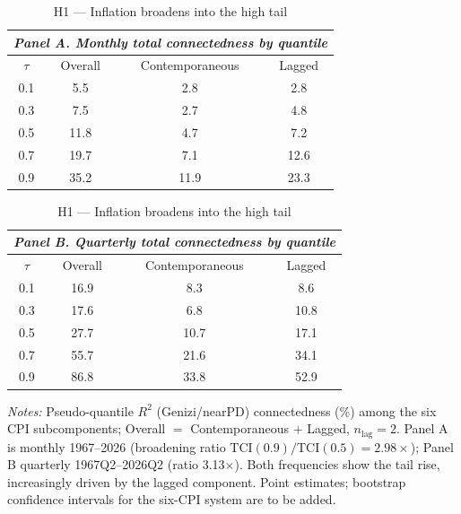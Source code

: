 \begin{table}[!ht]
\centering
\caption{H1 --- Inflation broadens into the high tail}
\label{tab:h1}
\setlength{\tabcolsep}{6pt}\footnotesize
\begin{threeparttable}
\begin{tabular}{c c c c}
\multicolumn{4}{l}{\textit{Panel A. Monthly total connectedness by quantile}}\\
\toprule
$\tau$ & Overall & Contemporaneous & Lagged \\
\midrule
0.1 & 5.5 & 2.8 & 2.8 \\
0.3 & 7.5 & 2.7 & 4.8 \\
0.5 & 11.8 & 4.7 & 7.2 \\
0.7 & 19.7 & 7.1 & 12.6 \\
0.9 & 35.2 & 11.9 & 23.3 \\
\bottomrule
\end{tabular}

\vspace{4pt}
\begin{tabular}{c c c c}
\multicolumn{4}{l}{\textit{Panel B. Quarterly total connectedness by quantile}}\\
\toprule
$\tau$ & Overall & Contemporaneous & Lagged \\
\midrule
0.1 & 16.9 & 8.3 & 8.6 \\
0.3 & 17.6 & 6.8 & 10.8 \\
0.5 & 27.7 & 10.7 & 17.1 \\
0.7 & 55.7 & 21.6 & 34.1 \\
0.9 & 86.8 & 33.8 & 52.9 \\
\bottomrule
\end{tabular}
\begin{tablenotes}[flushleft]\footnotesize
\item \textit{Notes:} Pseudo-quantile $R^2$ (Genizi/nearPD) connectedness (\%) among the six CPI subcomponents; Overall $=$ Contemporaneous $+$ Lagged, $n_{\text{lag}}=2$. Panel A is monthly 1967--2026 (broadening ratio $\text{TCI}(0.9)/\text{TCI}(0.5)=2.98\times$); Panel B quarterly 1967Q2--2026Q2 (ratio 3.13$\times$). Both frequencies show the tail rise, increasingly driven by the lagged component. Point estimates; bootstrap confidence intervals for the six-CPI system are to be added.
\end{tablenotes}
\end{threeparttable}
\end{table}

